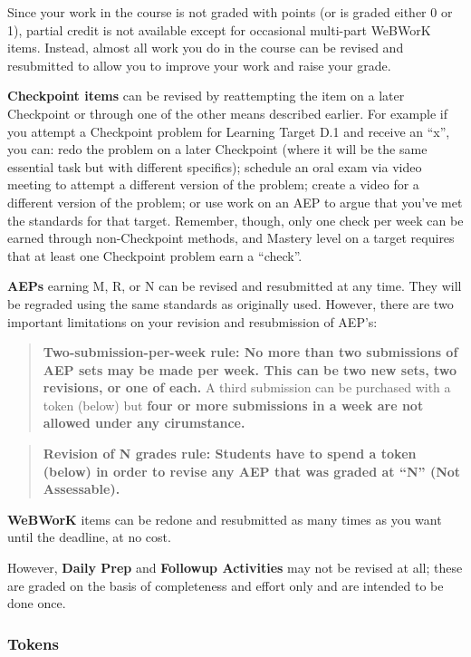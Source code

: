 \documentclass[]{article}
\begin{document}
Since your work in the course is not graded with points (or is graded
either 0 or 1), partial credit is not available except for occasional
multi-part WeBWorK items. Instead, almost all work you do in the course
can be revised and resubmitted to allow you to improve your work and
raise your grade.

\textbf{Checkpoint items} can be revised by reattempting the item on a
later Checkpoint or through one of the other means described earlier.
For example if you attempt a Checkpoint problem for Learning Target D.1
and receive an ``x'', you can: redo the problem on a later Checkpoint
(where it will be the same essential task but with different specifics);
schedule an oral exam via video meeting to attempt a different version
of the problem; create a video for a different version of the problem;
or use work on an AEP to argue that you've met the standards for that
target. Remember, though, only one check per week can be earned through
non-Checkpoint methods, and Mastery level on a target requires that at
least one Checkpoint problem earn a ``check''.

\textbf{AEPs} earning M, R, or N can be revised and resubmitted at any
time. They will be regraded using the same standards as originally used.
However, there are two important limitations on your revision and
resubmission of AEP's:

\begin{quote}
\textbf{Two-submission-per-week rule: No more than two submissions of
AEP sets may be made per week. This can be two new sets, two revisions,
or one of each.} A third submission can be purchased with a token
(below) but \textbf{four or more submissions in a week are not allowed
under any cirumstance.}
\end{quote}

\begin{quote}
\textbf{Revision of N grades rule: Students have to spend a token
(below) in order to revise any AEP that was graded at ``N'' (Not
Assessable).}
\end{quote}

\textbf{WeBWorK} items can be redone and resubmitted as many times as
you want until the deadline, at no cost.

However, \textbf{Daily Prep} and \textbf{Followup Activities} may not be
revised at all; these are graded on the basis of completeness and effort
only and are intended to be done once.

\hypertarget{tokens}{%
\subsubsection{Tokens}\label{tokens}}
\end{document}
